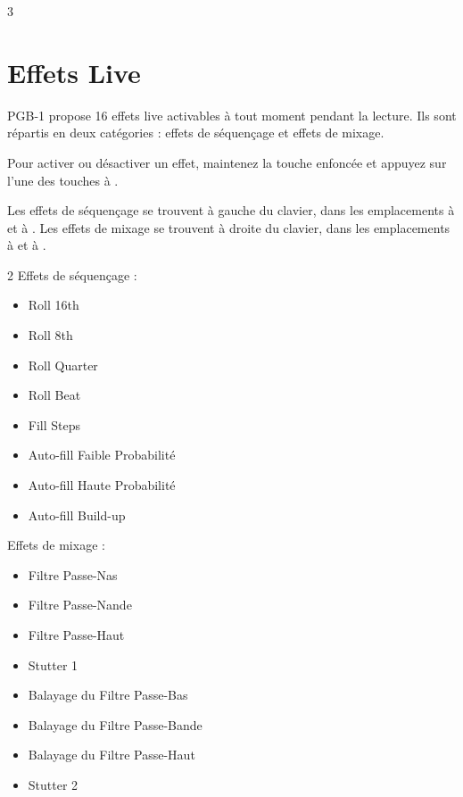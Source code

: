 \documentclass[8pt]{extarticle}
\def\device{PGB-1 }
\begin{document}
\begin{multicols*}{3}
\section{Effets Live}

\device propose 16 effets live activables à tout moment pendant la lecture. Ils sont répartis en deux catégories : effets de séquençage et effets de mixage.

Pour activer ou désactiver un effet, maintenez la touche  enfoncée et appuyez sur l'une des touches  à .

Les effets de séquençage se trouvent à gauche du clavier, dans les emplacements  à  et  à .
Les effets de mixage se trouvent à droite du clavier, dans les emplacements  à  et  à .

\begin{multicols}{2}
    Effets de séquençage :
    \begin{itemize}
    \item[\kbd{1}] Roll 16th
    \item[\kbd{2}] Roll 8th
    \item[\kbd{3}] Roll Quarter
    \item[\kbd{4}] Roll Beat
    \item[\kbd{9}] Fill Steps
    \item[\kbd{10}] Auto-fill Faible Probabilité
    \item[\kbd{11}] Auto-fill Haute Probabilité
    \item[\kbd{12}] Auto-fill Build-up
    \end{itemize}

    \columnbreak

    Effets de mixage :
    \begin{itemize}
    \item[\kbd{5}] Filtre Passe-Nas
    \item[\kbd{6}] Filtre Passe-Nande
    \item[\kbd{7}] Filtre Passe-Haut
    \item[\kbd{8}] Stutter 1
    \item[\kbd{13}] Balayage du Filtre Passe-Bas
    \item[\kbd{14}] Balayage du Filtre Passe-Bande
    \item[\kbd{15}] Balayage du Filtre Passe-Haut
    \item[\kbd{16}] Stutter 2
    \end{itemize}
\end{multicols}


\end{multicols*}
\end{document}

